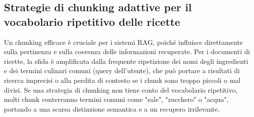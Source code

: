 \documentclass[a4paper, 11pt]{article}
\begin{document}
\subsection{Strategie di chunking adattive per il vocabolario ripetitivo delle ricette}
Un chunking efficace è cruciale per i sistemi RAG, poiché influisce direttamente sulla pertinenza e sulla coerenza delle informazioni recuperate. \cite{semantic_chunking_multimodal} Per i documenti di ricette, la sfida è amplificata dalla frequente ripetizione dei nomi degli ingredienti e dei termini culinari comuni (query dell'utente), che può portare a risultati di ricerca imprecisi o alla perdita di contesto se i chunk sono troppo piccoli o mal divisi. \cite{chunking_strategies_pinecone} Se una strategia di chunking non tiene conto del vocabolario ripetitivo, molti chunk conterranno termini comuni come "sale", "zucchero" o "acqua", portando a una scarsa distinzione semantica e a un recupero irrilevante. \cite{semantic_chunking_ani}
\end{document}
